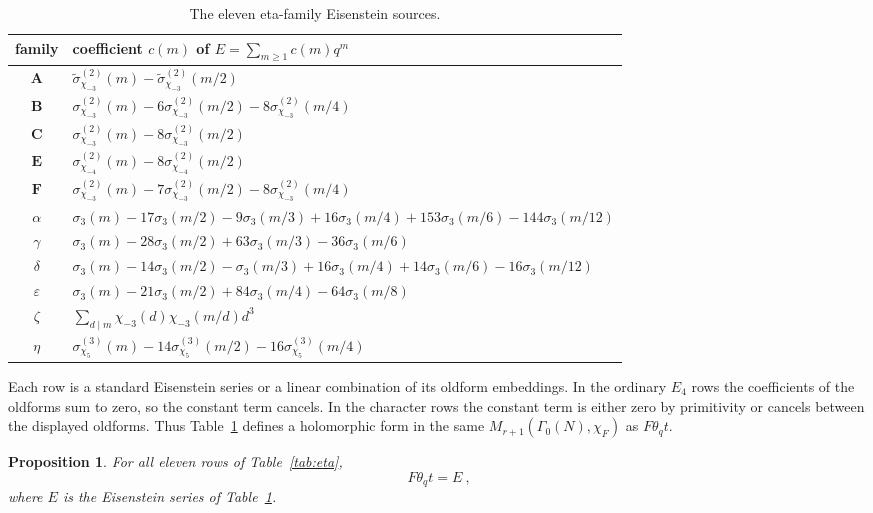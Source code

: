 \documentclass[11pt]{article}
\newtheorem{proposition}[theorem]{Proposition}
\theoremstyle{remark}
\newcommand{\Gzero}{\Gamma_0}
\newcommand{\thq}{\theta_q}
\newcommand{\chim}{\chi_{-3}}
\newcommand{\chifour}{\chi_{-4}}
\newcommand{\chifive}{\chi_{5}}
\newcommand{\sigin}[2]{\sigma_{#1}^{(#2)}}
\newcommand{\sigout}[2]{\widetilde\sigma_{#1}^{(#2)}}
\begin{document}
\begin{table}[ht]
\centering
\small
\renewcommand{\arraystretch}{1.24}
\begin{tabular}{@{}c p{11.8cm}@{}}
\toprule
family & coefficient $c(m)$ of $E=\sum_{m\ge1}c(m)q^m$\\
\midrule
$\mathbf A$ & $\sigout{\chim}{2}(m)-\sigout{\chim}{2}(m/2)$\\
$\mathbf B$ & $\sigin{\chim}{2}(m)-6\sigin{\chim}{2}(m/2)-8\sigin{\chim}{2}(m/4)$\\
$\mathbf C$ & $\sigin{\chim}{2}(m)-8\sigin{\chim}{2}(m/2)$\\
$\mathbf E$ & $\sigin{\chifour}{2}(m)-8\sigin{\chifour}{2}(m/2)$\\
$\mathbf F$ & $\sigin{\chim}{2}(m)-7\sigin{\chim}{2}(m/2)-8\sigin{\chim}{2}(m/4)$\\[2pt]
$\alpha$ & $\sigma_3(m)-17\sigma_3(m/2)-9\sigma_3(m/3)+16\sigma_3(m/4)+153\sigma_3(m/6)-144\sigma_3(m/12)$\\
$\gamma$ & $\sigma_3(m)-28\sigma_3(m/2)+63\sigma_3(m/3)-36\sigma_3(m/6)$\\
$\delta$ & $\sigma_3(m)-14\sigma_3(m/2)-\sigma_3(m/3)+16\sigma_3(m/4)+14\sigma_3(m/6)-16\sigma_3(m/12)$\\
$\varepsilon$ & $\sigma_3(m)-21\sigma_3(m/2)+84\sigma_3(m/4)-64\sigma_3(m/8)$\\
$\zeta$ & $\displaystyle\sum_{d\mid m}\chim(d)\chim(m/d)d^3$\\
$\eta$ & $\sigin{\chifive}{3}(m)-14\sigin{\chifive}{3}(m/2)-16\sigin{\chifive}{3}(m/4)$\\
\bottomrule
\end{tabular}
\caption{The eleven eta-family Eisenstein sources.}
\label{tab:sources}
\end{table}

Each row is a standard Eisenstein series or a linear combination of its oldform
embeddings.  In the ordinary $E_4$ rows the coefficients of the oldforms sum
to zero, so the constant term cancels.  In the character rows the constant
term is either zero by primitivity or cancels between the displayed oldforms.
Thus Table~\ref{tab:sources} defines a holomorphic form in the same
$M_{r+1}(\Gzero(N),\chi_F)$ as $F\thq t$.

\begin{proposition}\label{prop:eta-source}
For all eleven rows of Table~\ref{tab:eta},
\[
 \boxed{\ F\thq t=E\ },
\]
where $E$ is the Eisenstein series of Table~\ref{tab:sources}.
\end{proposition}
\end{document}
